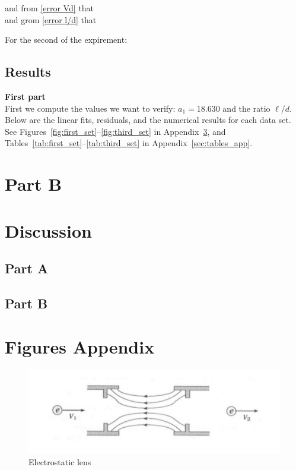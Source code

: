 \documentclass[12pt]{article}
\begin{document}
and from \eqref{error Vd} that 
\\

and grom \eqref{error l/d} that


For the second of the expirement: 

\pagebreak
\subsection{Results}
\textbf{First part}\\
First we compute the values we want to verify: $a_1 = 18.630$ and the ratio $\ell/d$.  
Below are the linear fits, residuals, and the numerical results for each data set.\\

See Figures~\ref{fig:first_set}–\ref{fig:third_set}
in Appendix~\ref{sec:figures_app},
and Tables~\ref{tab:first_set}–\ref{tab:third_set}
in Appendix~\ref{sec:tables_app}.

\section{Part B}

\section{Discussion}
\subsection{Part A}

\subsection{Part B}


\pagebreak

\appendix
{}

\section{Figures Appendix}
\label{sec:figures_app}
\FloatBarrier

\begin{figure}[H]
  \centering
  \includegraphics[width=0.5\linewidth]{electrostatic lens.png}
  \caption{Electrostatic lens}
  \label{fig:lens}
\end{figure}
\end{document}
